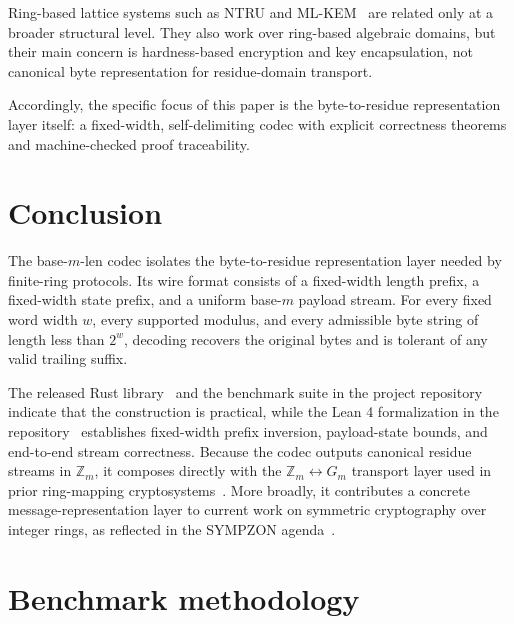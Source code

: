 \documentclass{system-security-article}
\newcommand{\Zm}{\ensuremath{\mathbb{Z}_m}}
\newcommand{\Gm}{\ensuremath{G_m}}
\newcommand{\BaseM}{base-\(m\)}
\newcommand{\BaseMLen}{\BaseM{}-len}
\begin{document}
    Ring-based lattice systems such as NTRU and ML-KEM~\cite{ntru1998,nist2024post} are related only at a broader structural level.
    They also work over ring-based algebraic domains, but their main concern is hardness-based encryption and key encapsulation,
    not canonical byte representation for residue-domain transport.

    Accordingly, the specific focus of this paper is the byte-to-residue representation layer itself:
    a fixed-width, self-delimiting codec with explicit correctness theorems and machine-checked proof traceability.

    \section{Conclusion}
    \label{sec:conclusion}

    The \BaseMLen{} codec isolates the byte-to-residue representation layer needed by finite-ring protocols.
    Its wire format consists of a fixed-width length prefix, a fixed-width state prefix, and a uniform \BaseM{} payload stream.
    For every fixed word width \(w\), every supported modulus, and every admissible byte string of length less than \(2^{w}\),
    decoding recovers the original bytes and is tolerant of any valid trailing suffix.

    The released Rust library~\cite{riabov2026encodingcrate} and the benchmark suite in the
    project repository indicate that the construction is practical,
    while the Lean 4 formalization in the repository~\cite{riabov2026encodingrepo}
    establishes fixed-width prefix inversion, payload-state bounds, and end-to-end stream correctness.
    Because the codec outputs canonical residue streams in \(\Zm\), it composes directly
    with the \(\Zm \leftrightarrow \Gm\) transport layer used in prior ring-mapping
    cryptosystems~\cite{kryvyi2022symmetric,kryvyi2025symmetric}.
    More broadly, it contributes a concrete message-representation layer to current work on
    symmetric cryptography over integer rings, as reflected in the SYMPZON agenda~\cite{sympzon}.

    \appendix

    \section{Benchmark methodology}
    \label{sec:bench}
\end{document}
